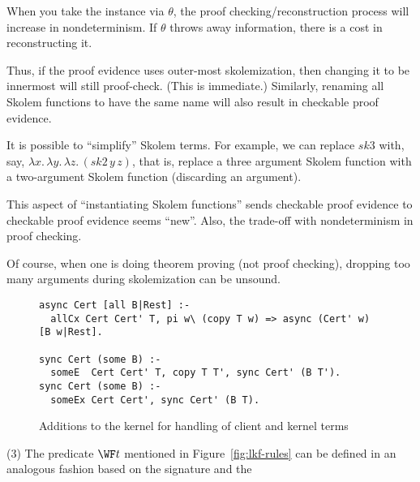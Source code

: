 When you take the instance via $\theta$, the proof
checking/reconstruction process will increase in nondeterminism.  If
$\theta$ throws away information, there is a cost in reconstructing
it.

Thus, if the proof evidence uses outer-most skolemization, then
changing it to be innermost will still proof-check.  (This is
immediate.)  Similarly, renaming all Skolem functions to have the same
name will also result in checkable proof evidence.

It is possible to ``simplify'' Skolem terms.  For example, we can
replace $sk3$ with, say, $\lambda x.\, \lambda y.\, \lambda z.\,
(sk2\, y\, z)$, that is, replace a three argument Skolem function with
a two-argument Skolem function (discarding an argument).

This aspect of ``instantiating Skolem functions'' sends checkable
proof evidence to checkable proof evidence seems ``new''.  Also, the
trade-off with nondeterminism in proof checking.

Of course, when one is doing theorem proving (not proof checking),
dropping too many arguments during skolemization can be unsound.



\begin{figure}
  \centering
  \begin{lstlisting}
async Cert [all B|Rest] :-
  allCx Cert Cert' T, pi w\ (copy T w) => async (Cert' w) [B w|Rest].

sync Cert (some B) :-
  someE  Cert Cert' T, copy T T', sync Cert' (B T').
sync Cert (some B) :-
  someEx Cert Cert', sync Cert' (B T).
  \end{lstlisting}
\caption{Additions to the kernel for handling of client and kernel terms}
  \label{fig:newkernel}
\end{figure}


%
(3) The predicate $\WF t$ mentioned in Figure~\ref{fig:lkf-rules} can
be defined in an analogous fashion based on the signature and the 



%
%


